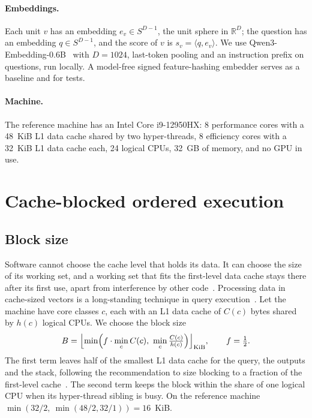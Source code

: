 \documentclass[10pt,twocolumn]{article}
\theoremstyle{definition}
\theoremstyle{remark}
\begin{document}
\paragraph{Embeddings.}
Each unit $v$ has an embedding $e_v\in S^{D-1}$, the unit sphere in $\mathbb R^D$; the question has an embedding $q\in S^{D-1}$, and the score of $v$ is $s_v=\langle q,e_v\rangle$.
We use Qwen3-Embedding-0.6B~\cite{zhang2025qwen3embedding} with $D=1024$, last-token pooling and an instruction prefix on questions, run locally.
A model-free signed feature-hashing embedder serves as a baseline and for tests.

\paragraph{Machine.}
The reference machine has an Intel Core i9-12950HX: 8 performance cores with a 48~KiB L1 data cache shared by two hyper-threads, 8 efficiency cores with a 32~KiB L1 data cache each, 24 logical CPUs, 32~GB of memory, and no GPU in use.

\section{Cache-blocked ordered execution}\label{sec:exec}

\subsection{Block size}
Software cannot choose the cache level that holds its data.
It can choose the size of its working set, and a working set that fits the first-level data cache stays there after its first use, apart from interference by other code~\cite{lam1991blocked,frigo1999cacheoblivious}.
Processing data in cache-sized vectors is a long-standing technique in query execution~\cite{boncz2005x100,leis2014morsel}.
Let the machine have core classes $c$, each with an L1 data cache of $C(c)$ bytes shared by $h(c)$ logical CPUs.
We choose the block size
\begin{equation}\label{eq:block}
B=\Bigl\lfloor \min\Bigl( f\cdot \min_c C(c),\ \min_c \tfrac{C(c)}{h(c)} \Bigr)\Bigr\rfloor_{\mathrm{KiB}},\qquad f=\tfrac12 .
\end{equation}
The first term leaves half of the smallest L1 data cache for the query, the outputs and the stack, following the recommendation to size blocking to a fraction of the first-level cache~\cite{intel2024optmanual}.
The second term keeps the block within the share of one logical CPU when its hyper-thread sibling is busy.
On the reference machine $\min(32/2,\ \min(48/2, 32/1))=16$~KiB.
\end{document}
